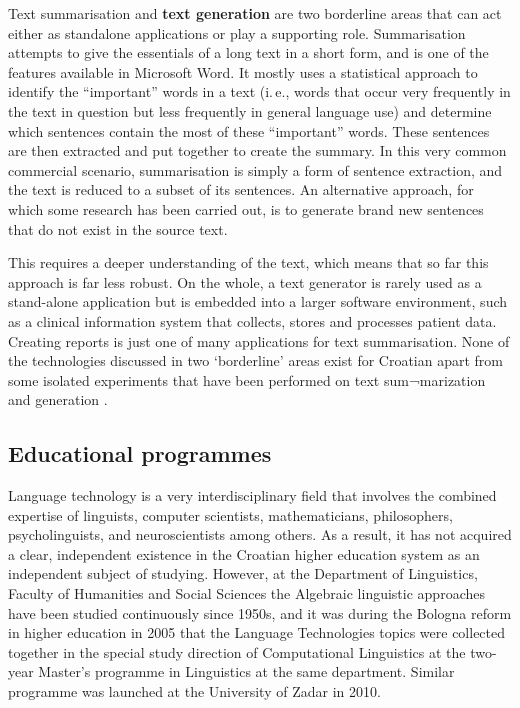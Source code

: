 \begin{multicols}{2}
Text summarisation and \textbf{text generation} are two borderline areas that can act either as standalone applications or play a supporting role. Summarisation attempts to give the essentials of a long text in a short form, and is one of the features available in Microsoft Word. It mostly uses a statistical approach to identify the “important” words in a text (i.\,e., words that occur very frequently in the text in question but less frequently in general language use) and determine which sentences contain the most of these “important” words. These sentences are then extracted and put together to create the summary. In this very common commercial scenario, summarisation is simply a form of sentence extraction, and the text is reduced to a subset of its sentences. An alternative approach, for which some research has been carried out, is to generate brand new sentences that do not exist in the source text. 


This requires a deeper understanding of the text, which means that so far this approach is far less robust. On the whole, a text generator is rarely used as a stand-alone application but is embedded into a larger software environment, such as a clinical information system that collects, stores and processes patient data. Creating reports is just one of many applications for text summarisation. None of the technologies discussed in two ‘borderline’ areas exist for Croatian apart from some isolated experiments that have been performed on text sum¬marization \cite{art5} and generation \cite{art6}. 

\subsection{Educational programmes}

Language technology is a very interdisciplinary field that involves the combined expertise of linguists, computer scientists, mathematicians, philosophers, psycholinguists, and neuroscientists among others. As a result, it has not acquired a clear, independent existence in the Croatian higher education system as an independent subject of studying. However, at the Department of Linguistics, Faculty of Humanities and Social Sciences the Algebraic linguistic approaches have been studied continuously since 1950s, and it was during the Bologna reform in higher education in 2005 that the Language Technologies topics were collected together in the special study direction of Computational Linguistics at the two-year Master’s programme in Linguistics at the same department. Similar programme was launched at the University of Zadar in 2010.


\end{multicols}

